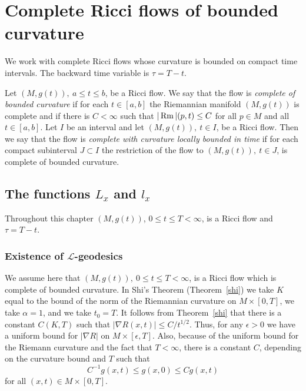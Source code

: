 \chapter{Complete Ricci flows of bounded curvature}
\label{chap:complete-ricci-flows}
\label{newcomp2}

We work with complete Ricci flows whose curvature is bounded on compact
time intervals. The backward time variable is $\tau=T-t$.

\begin{definition}
\label{def:complete-bounded-curvature-flow}

Let $(M,g(t)),\ a\le t\le b$, be a  Ricci flow. We say that the flow
is {\em complete of bounded curvature} if for each $t\in [a,b]$ the
Riemannian manifold $(M,g(t))$ is complete and if there is
$C<\infty$ such that $|\operatorname{Rm}|(p,t)\le C$ for all $p\in M$ and all
$t\in [a,b]$. Let $I$ be an interval and let $(M,g(t)),\ t\in I$, be
a Ricci flow. Then we say that the flow is {\em complete with
curvature locally bounded in time} if for each compact subinterval
$J\subset I$ the restriction of the flow to $(M,g(t)),\ t\in J$, is
complete of bounded curvature.
\end{definition}




\section{The functions $L_{x}$ and $l_{x}$}

Throughout this chapter $(M,g(t))$, $0\le t\le T<\infty$, is a Ricci
flow and $\tau=T-t$.

\subsection{Existence of ${\mathcal L}$-geodesics}


We assume here that $(M,g(t)),\ 0\le t\le T<\infty$, is a Ricci flow
which is complete of bounded curvature. In Shi's Theorem
(Theorem~\ref{shi}) we take $K$ equal to the bound of the norm of
the Riemannian curvature on $M\times [0,T]$, we take $\alpha=1$, and
we take $t_0=T$. It follows from Theorem~\ref{shi} that there is a
constant $C(K,T)$ such that $|\nabla R(x,t)|\le C/t^{1/2}$. Thus,
for any $\epsilon>0$ we have a uniform bound for $|\nabla R|$ on
$M\times [\epsilon,T]$. Also, because of the uniform bound for the
Riemann curvature and the fact that $T<\infty$, there is a constant
$C$, depending on the curvature bound and $T$ such that
\begin{equation}\label{compmetric}
C^{-1}g(x,t)\le g(x,0)\le Cg(x,t)
\end{equation}
for all $(x,t)\in M\times [0,T]$.





